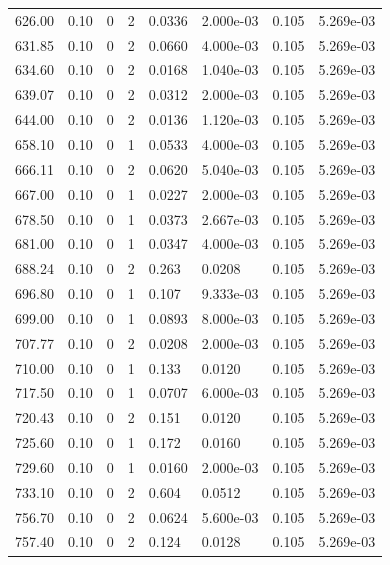 \documentclass[preview]{standalone}
\begin{document}
{{{{\begin{tabular}{L{1.2cm}C{1.2cm} C{0.3cm}C{0.5cm} C{1.4cm}C{1.4cm} C{1.4cm}C{1.4cm}}
  626.00  &  0.10  & 0     &  2 &  0.0336  & 2.000e-03  & 0.105 &  5.269e-03   \\ 
  631.85  &  0.10  & 0     &  2 &  0.0660  & 4.000e-03  & 0.105 &  5.269e-03   \\ 
  634.60  &  0.10  & 0     &  2 &  0.0168  & 1.040e-03  & 0.105 &  5.269e-03   \\ 
  639.07  &  0.10  & 0     &  2 &  0.0312  & 2.000e-03  & 0.105 &  5.269e-03   \\ 
  644.00  &  0.10  & 0     &  2 &  0.0136  & 1.120e-03  & 0.105 &  5.269e-03   \\ 
  658.10  &  0.10  & 0     &  1 &  0.0533  & 4.000e-03  & 0.105 &  5.269e-03   \\ 
  666.11  &  0.10  & 0     &  2 &  0.0620  & 5.040e-03  & 0.105 &  5.269e-03   \\ 
  667.00  &  0.10  & 0     &  1 &  0.0227  & 2.000e-03  & 0.105 &  5.269e-03   \\ 
  678.50  &  0.10  & 0     &  1 &  0.0373  & 2.667e-03  & 0.105 &  5.269e-03   \\ 
  681.00  &  0.10  & 0     &  1 &  0.0347  & 4.000e-03  & 0.105 &  5.269e-03   \\ 
  688.24  &  0.10  & 0     &  2 &  0.263  & 0.0208  & 0.105 &  5.269e-03   \\ 
  696.80  &  0.10  & 0     &  1 &  0.107  & 9.333e-03  & 0.105 &  5.269e-03   \\ 
  699.00  &  0.10  & 0     &  1 &  0.0893  & 8.000e-03  & 0.105 &  5.269e-03   \\ 
  707.77  &  0.10  & 0     &  2 &  0.0208  & 2.000e-03  & 0.105 &  5.269e-03   \\ 
  710.00  &  0.10  & 0     &  1 &  0.133  & 0.0120  & 0.105 &  5.269e-03   \\ 
  717.50  &  0.10  & 0     &  1 &  0.0707  & 6.000e-03  & 0.105 &  5.269e-03   \\ 
  720.43  &  0.10  & 0     &  2 &  0.151  & 0.0120  & 0.105 &  5.269e-03   \\ 
  725.60  &  0.10  & 0     &  1 &  0.172  & 0.0160  & 0.105 &  5.269e-03   \\ 
  729.60  &  0.10  & 0     &  1 &  0.0160  & 2.000e-03  & 0.105 &  5.269e-03   \\ 
  733.10  &  0.10  & 0     &  2 &  0.604  & 0.0512  & 0.105 &  5.269e-03   \\ 
  756.70  &  0.10  & 0     &  2 &  0.0624  & 5.600e-03  & 0.105 &  5.269e-03   \\ 
  757.40  &  0.10  & 0     &  2 &  0.124  & 0.0128  & 0.105 &  5.269e-03   \\ 

\end{tabular}}}}}
\end{document}
